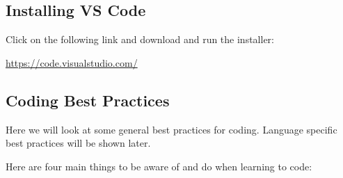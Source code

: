 \documentclass[11pt,a4paper]{report}
\begin{document}
\subsection{Installing VS Code}
Click on the following link and download and run the installer: 

\url{https://code.visualstudio.com/}

\subsection{Coding Best Practices}

Here we will look at some general best practices for coding. Language specific best practices will be shown later.

Here are four main things to be aware of and do when learning to code: 
\end{document}
